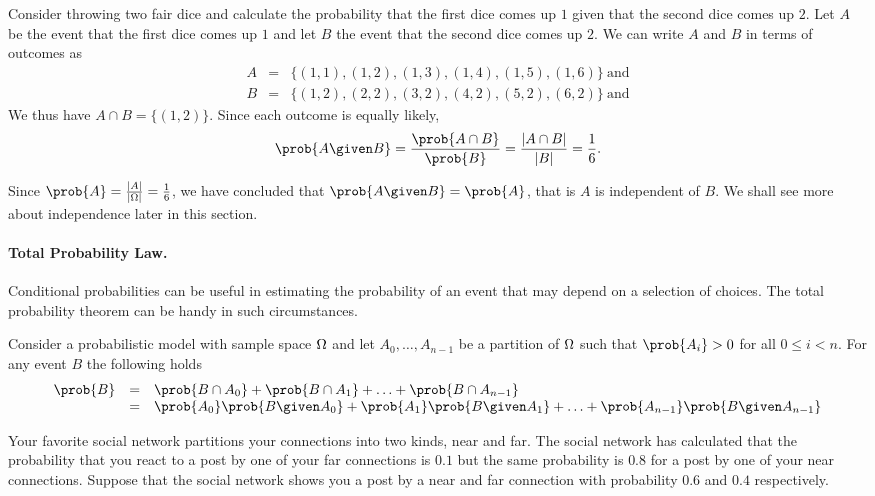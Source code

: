 {\begin{example}
Consider throwing two fair dice and calculate the probability that the
first dice comes up $1$ given that the second dice comes up $2$. 
%
Let $A$ be the event  that the first dice comes up $1$ and let $B$ the
event that the second dice comes up $2$.
%
We can write $A$ and $B$ in terms of outcomes as 
\[
\begin{array}{lll}
A & = & \{ (1,1), (1,2), (1,3), (1,4), (1,5), (1,6) \}~\mbox{and}
\\
B & = & \{ (1,2), (2,2), (3,2), (4,2), (5,2), (6,2) \}~\mbox{and}
\end{array}
\]
We thus have $A \cap B = \{ (1,2) \}$.
%
Since each outcome is equally likely, 
\[
\prob{A \given B} = \frac{\prob{A \cap B}}{\prob{B}} 
%
= 
%
\frac{|A \cap B|}{|B|} = \frac{1}{6}.
\]

Since $\prob{A} = \frac{|A|}{|\SSpace|} = \frac{1}{6}$, we have
concluded that $\prob{A \given B} = \prob{A}$, that is $A$ is
independent of $B$.  We shall see more about independence later in this
section.

\end{example}


\paragraph{Total Probability Law.}
Conditional probabilities can be useful in estimating the probability
of an event that may depend on a selection of choices.
%
The total probability theorem can be handy in such circumstances.

\begin{theorem}
Consider a probabilistic model with sample space $\Omega$ and let
$A_0, \ldots, A_{n-1}$ be a partition of $\Omega$ such that $\prob{A_i} >
0$ for all $0 \le i < n$. 
%
For any event $B$ the following holds
\[
\begin{array}{lll}
\prob{B} 
& = & 
\prob{B \cap A_0} + \prob{B \cap A_1} + \ldots + \prob{B \cap A_{n-1}}
\\
& = & 
\prob{A_0}\prob{B  \given A_0} + \prob{A_1}\prob{B \given A_1} + \ldots + \prob{A_{n-1}}\prob{B \given A_{n-1}}
\end{array}
\]
\end{theorem}

\begin{example}
Your favorite social network partitions your connections into two
kinds, near and far.
%
The social network has calculated that the probability that you react
to a post by one of your far connections is $0.1$ but the same
probability is $0.8$ for a post by one of your near connections.
%
Suppose that the social network shows you a post by a near and far
connection with probability $0.6$ and $0.4$ respectively. 
%


\end{example}}
